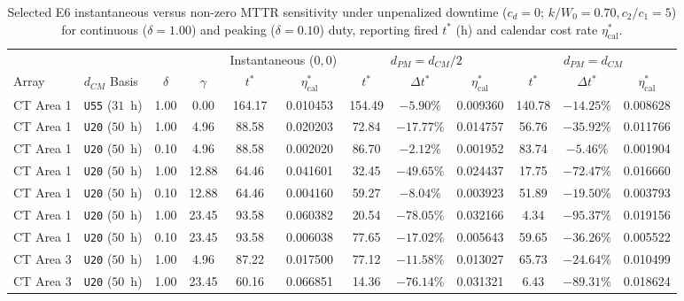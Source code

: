 \documentclass{elektr}
\begin{document}
\begin{table}[htbp]
\centering
\scriptsize
\renewcommand{\arraystretch}{0.80}
\setlength{\tabcolsep}{1.8pt}
\caption{Selected E6 instantaneous versus non-zero MTTR sensitivity under unpenalized downtime ($c_d = 0$; $k/W_0 = 0.70, c_2/c_1 = 5$) for continuous ($\delta=1.00$) and peaking ($\delta=0.10$) duty, reporting fired $t^*$ (h) and calendar cost rate $\eta_{\mathrm{cal}}^*$.}
\label{tab:case_e6}
\begin{tabular*}{\textwidth}{@{\extracolsep{\fill}}llcc|cc|ccc|ccc@{}}
\toprule
 & & & & \multicolumn{2}{c|}{Instantaneous ($0,0$)} & \multicolumn{3}{c|}{$d_{PM} = d_{CM}/2$} & \multicolumn{3}{c}{$d_{PM} = d_{CM}$} \\
Array & $d_{CM}$ Basis & $\delta$ & $\gamma$ & $t^*$ & $\eta_{\mathrm{cal}}^*$ & $t^*$ & $\Delta t^*$ & $\eta_{\mathrm{cal}}^*$ & $t^*$ & $\Delta t^*$ & $\eta_{\mathrm{cal}}^*$ \\
\midrule
CT Area 1   & \texttt{U55} ($31$~h)     & 1.00 & 0.00  & 164.17 & 0.010453 & 154.49 & $-5.90\%$  & 0.009360 & 140.78 & $-14.25\%$ & 0.008628 \\
CT Area 1   & \texttt{U20} ($50$~h)     & 1.00 & 4.96  & 88.58  & 0.020203 & 72.84  & $-17.77\%$ & 0.014757 & 56.76  & $-35.92\%$ & 0.011766 \\
CT Area 1   & \texttt{U20} ($50$~h)     & 0.10 & 4.96  & 88.58  & 0.002020 & 86.70  & $-2.12\%$  & 0.001952 & 83.74  & $-5.46\%$  & 0.001904 \\
CT Area 1   & \texttt{U20} ($50$~h)     & 1.00 & 12.88 & 64.46  & 0.041601 & 32.45  & $-49.65\%$ & 0.024437 & 17.75  & $-72.47\%$ & 0.016660 \\
CT Area 1   & \texttt{U20} ($50$~h)     & 0.10 & 12.88 & 64.46  & 0.004160 & 59.27  & $-8.04\%$  & 0.003923 & 51.89  & $-19.50\%$ & 0.003793 \\
CT Area 1   & \texttt{U20} ($50$~h)     & 1.00 & 23.45 & 93.58  & 0.060382 & 20.54  & $-78.05\%$ & 0.032166 & 4.34   & $-95.37\%$ & 0.019156 \\
CT Area 1   & \texttt{U20} ($50$~h)     & 0.10 & 23.45 & 93.58  & 0.006038 & 77.65  & $-17.02\%$ & 0.005643 & 59.65  & $-36.26\%$ & 0.005522 \\
\midrule
CT Area 3   & \texttt{U20} ($50$~h)     & 1.00 & 4.96  & 87.22  & 0.017500 & 77.12  & $-11.58\%$ & 0.013027 & 65.73  & $-24.64\%$ & 0.010499 \\
CT Area 3   & \texttt{U20} ($50$~h)     & 1.00 & 23.45 & 60.16  & 0.066851 & 14.36  & $-76.14\%$ & 0.031321 & 6.43   & $-89.31\%$ & 0.018624 \\

\end{tabular*}
\end{table}
\end{document}
